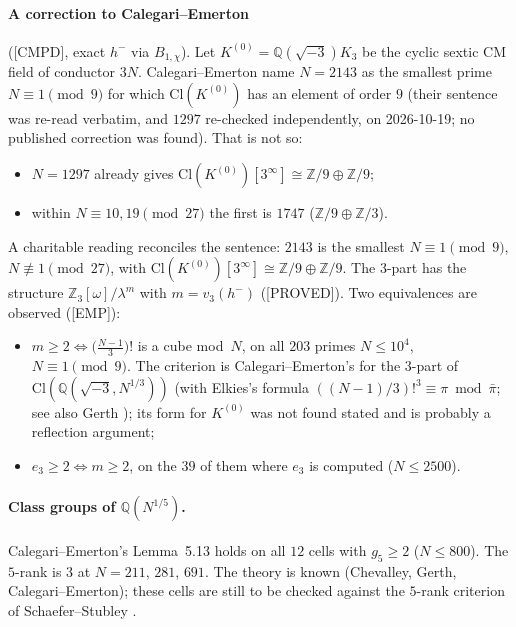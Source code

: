 \documentclass[11pt]{article}
\newcommand{\Z}{\mathbb{Z}}
\newcommand{\Q}{\mathbb{Q}}
\newcommand{\PROVED}{\textsf{\small[PROVED]}}
\newcommand{\CMPD}{\textsf{\small[CMPD]}}
\newcommand{\EMP}{\textsf{\small[EMP]}}
\begin{document}
\paragraph{A correction to Calegari--Emerton} (\CMPD, exact $h^{-}$ via $B_{1,\chi}$). Let $K^{(0)}=\Q(\sqrt{-3})K_3$ be the cyclic sextic
CM field of conductor $3N$. Calegari--Emerton \cite[\S6]{calegari_emerton} name $N=2143$ as the smallest prime $N\equiv1\pmod9$ for which $\mathrm{Cl}(K^{(0)})$ has
an element of order $9$ (their sentence was re-read verbatim, and $1297$ re-checked independently, on 2026-10-19; no published correction was
found). That is not so:
\begin{itemize}[leftmargin=1.6em,itemsep=1pt]
\item $N=1297$ already gives $\mathrm{Cl}(K^{(0)})[3^{\infty}]\cong\Z/9\oplus\Z/9$;
\item within $N\equiv10,19\pmod{27}$ the first is $1747$ ($\Z/9\oplus\Z/3$).
\end{itemize}
A charitable reading reconciles the sentence: $2143$ is the smallest $N\equiv1\pmod9$, $N\not\equiv1\pmod{27}$, with
$\mathrm{Cl}(K^{(0)})[3^{\infty}]\cong\Z/9\oplus\Z/9$.
The $3$-part has the structure $\Z_3[\omega]/\lambda^{m}$ with $m=v_3(h^{-})$ (\PROVED). Two equivalences are observed (\EMP):
\begin{itemize}[leftmargin=1.6em,itemsep=1pt]
\item $m\ge2\iff\bigl(\tfrac{N-1}{3}\bigr)!$ is a cube mod~$N$, on all $203$ primes $N\le10^{4}$, $N\equiv1\pmod9$. The criterion is
  Calegari--Emerton's \cite[Thm.~1.3(i)]{calegari_emerton} for the $3$-part of $\mathrm{Cl}(\Q(\sqrt{-3},N^{1/3}))$ (with Elkies's formula
  $((N-1)/3)!^{3}\equiv\pi\bmod\bar\pi$; see also Gerth \cite{ph_gerth05}); its form for $K^{(0)}$ was not found stated and is probably a
  reflection argument;
\item $e_3\ge2\iff m\ge2$, on the $39$ of them where $e_3$ is computed ($N\le2500$).
\end{itemize}

\paragraph{Class groups of $\Q(N^{1/5})$.} Calegari--Emerton's Lemma~5.13 holds on all $12$ cells with $g_5\ge2$ ($N\le800$). The $5$-rank is
$3$ at $N=211$, $281$, $691$. The theory is known (Chevalley, Gerth, Calegari--Emerton); these cells are still to be checked against the
$5$-rank criterion of Schaefer--Stubley \cite{ph_schaefer_stubley}.
\end{document}
